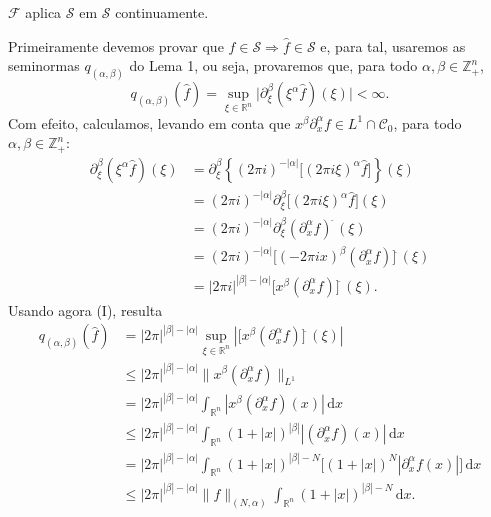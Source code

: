 \documentclass[../distribution_theory_notes.tex]{subfiles}
\begin{document}
\begin{theorem*}
	\(\mathcal{F}\) aplica \(\mathcal{S}\) em \(\mathcal{S}\) continuamente.
\end{theorem*}
\begin{proof*}
	Primeiramente devemos provar que \(f\in \mathcal{S}\Rightarrow \hat{f}\in \mathcal{S}\) e, para tal, usaremos as seminormas \(q_{(\alpha ,\beta )}\) do Lema 1, ou seja, provaremos que, para todo \(\alpha ,\beta \in \mathbb{Z}_{+}^{n}\),
	\[
		q_{(\alpha ,\beta )}(\hat{f})
		=\sup_{\xi \in \mathbb{R}^{n}}\bigl|\partial _{\xi }^{\beta }(\xi ^{\alpha }\hat{f})(\xi )\bigr|<\infty .
	\]
	Com efeito, calculamos, levando em conta que \(x^{\beta }\partial _{x}^{\alpha }f\in L^{1}\cap \mathcal{C}_{0}\), para todo \(\alpha ,\beta \in \mathbb{Z}_{+}^{n}\):
	\begin{align*}
		\partial _{\xi }^{\beta }(\xi ^{\alpha }\hat{f})(\xi )
		 & =\partial _{\xi }^{\beta }\left\{(2\pi i)^{-|\alpha |}\bigl[(2\pi i\xi )^{\alpha }\hat{f}\bigr]\right\}(\xi ) \\
		 & =(2\pi i)^{-|\alpha |}\partial _{\xi }^{\beta }\bigl[(2\pi i\xi )^{\alpha }\hat{f}\bigr](\xi )                \\
		 & =(2\pi i)^{-|\alpha |}\partial _{\xi }^{\beta }(\partial _{x}^{\alpha }f)^{\widehat{\; }}(\xi )               \\
		 & =(2\pi i)^{-|\alpha |}\bigl[(-2\pi i x)^{\beta }(\partial _{x}^{\alpha }f)\bigr]^{\widehat{\; }}(\xi )        \\
		 & =|2\pi i|^{|\beta |-|\alpha |}\bigl[x^{\beta }(\partial _{x}^{\alpha }f)\bigr]^{\widehat{\; }}(\xi ).
	\end{align*}
	Usando agora (I), resulta
	\begin{align*}
		q_{(\alpha ,\beta )}(\hat{f})
		 & =|2\pi |^{|\beta |-|\alpha |}
		\sup_{\xi \in \mathbb{R}^{n}}
		\left|\bigl[x^{\beta }(\partial _{x}^{\alpha }f)\bigr]^{\widehat{\; }}(\xi )\right|                                     \\
		 & \leq |2\pi |^{|\beta |-|\alpha |}\|x^{\beta }(\partial _{x}^{\alpha }f)\|_{L^{1}}                                    \\
		 & =|2\pi |^{|\beta |-|\alpha |}\int_{\mathbb{R}^{n}}|x^{\beta }(\partial _{x}^{\alpha }f)(x)|\,\mathrm{d}x             \\
		 & \leq |2\pi |^{|\beta |-|\alpha |}\int_{\mathbb{R}^{n}}(1+|x|)^{|\beta |}|(\partial _{x}^{\alpha }f)(x)|\,\mathrm{d}x \\
		 & =|2\pi |^{|\beta |-|\alpha |}\int_{\mathbb{R}^{n}}(1+|x|)^{|\beta |-N}
		\bigl[(1+|x|)^{N}|\partial _{x}^{\alpha }f(x)|\bigr] \,\mathrm{d}x                                                      \\
		 & \leq |2\pi |^{|\beta |-|\alpha |}\|f\|_{(N,\alpha )}
		\int_{\mathbb{R}^{n}}(1+|x|)^{|\beta |-N}\,\mathrm{d}x.
	\end{align*}


\end{proof*}
\end{document}
